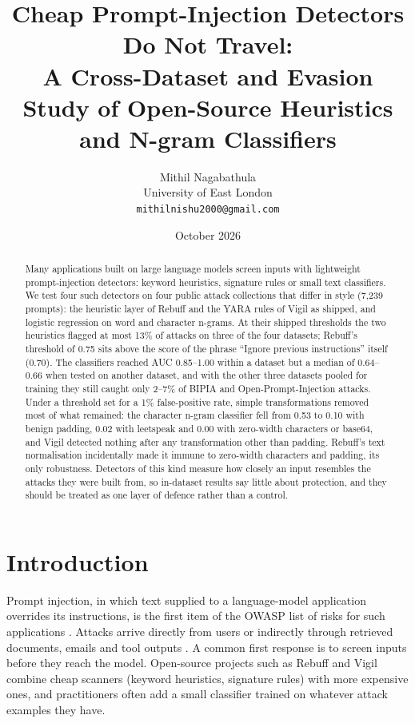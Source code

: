 \documentclass[11pt]{article}
\title{Cheap Prompt-Injection Detectors Do Not Travel:\\
\large A Cross-Dataset and Evasion Study of Open-Source Heuristics and N-gram Classifiers}
\author{Mithil Nagabathula\\University of East London\\\texttt{mithilnishu2000@gmail.com}}
\date{October 2026}
\begin{document}
\maketitle
\sloppy

\begin{abstract}
Many applications built on large language models screen inputs with lightweight prompt-injection detectors: keyword heuristics,
signature rules or small text classifiers. We test four such detectors on four public attack collections that differ in
style (7{,}239 prompts): the heuristic layer of Rebuff and the YARA rules of Vigil as shipped, and logistic regression on word and
character n-grams. At their shipped thresholds the two heuristics flagged at most 13\% of attacks on three of the four
datasets; Rebuff's threshold of 0.75 sits above the score of the phrase ``Ignore previous instructions'' itself (0.70). The
classifiers reached AUC 0.85--1.00 within a dataset but a median of 0.64--0.66 when tested on another dataset, and with
the other three datasets pooled for training they still caught only 2--7\% of BIPIA and Open-Prompt-Injection attacks. Under
a threshold set for a 1\% false-positive rate, simple transformations removed most of what remained: the character
n-gram classifier fell from 0.53 to 0.10 with benign padding, 0.02 with leetspeak and 0.00 with zero-width characters or
base64, and Vigil detected nothing after any transformation other than padding. Rebuff's text normalisation incidentally made it immune to
zero-width characters and padding, its only robustness. Detectors of this kind measure how closely an input resembles
the attacks they were built from, so in-dataset results say little about protection, and they should be treated as one
layer of defence rather than a control.
\end{abstract}

\section{Introduction}
Prompt injection, in which text supplied to a language-model application overrides its instructions, is the first item
of the OWASP list of risks for such applications \cite{owasp2025llm}. Attacks arrive directly from users
\cite{perez2022ignore} or indirectly through retrieved documents, emails and tool outputs \cite{greshake2023indirect}. A common
first response is to screen inputs before they reach the model. Open-source projects such as Rebuff \cite{rebuff} and Vigil
\cite{vigil} combine cheap scanners (keyword heuristics, signature rules) with more expensive ones, and practitioners
often add a small classifier trained on whatever attack examples they have.
\end{document}
